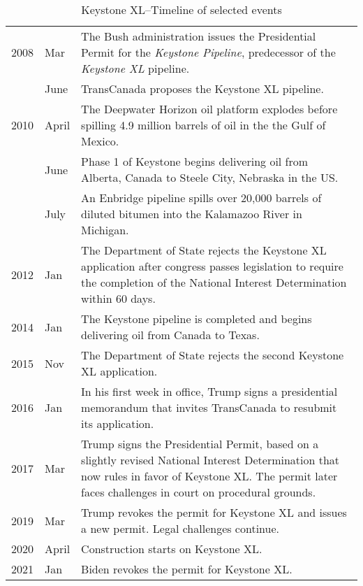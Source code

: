 
\begin{table}
\caption{Keystone XL--Timeline of selected events}
\label{tab:timeline}
\begin{tabularx}{\textwidth}{r @{\hspace{0.5\tabcolsep}} l |@{\timeline} X}
\toprule

2008 & Mar   & The Bush administration issues the Presidential Permit for the \textit{Keystone Pipeline}, predecessor of the \textit{Keystone XL} pipeline.\\
	 & June  & TransCanada proposes the Keystone XL pipeline.\\
2010 & April & The Deepwater Horizon oil platform explodes before spilling 4.9 million barrels of oil in the the Gulf of Mexico.\\
	 & June  & Phase 1 of Keystone begins delivering oil from Alberta, Canada to Steele City, Nebraska in the US.\\
	 & July  & An Enbridge pipeline spills over 20,000 barrels of diluted bitumen into the Kalamazoo River in Michigan.\\
2012 & Jan   & The Department of State rejects the Keystone XL application after congress passes legislation to require the completion of the National Interest Determination within 60 days.\\
2014 & Jan	 & The Keystone pipeline is completed and begins delivering oil from Canada to Texas.\\
2015 & Nov	 & The Department of State rejects the second Keystone XL application.\\
2016 & Jan 	 & In his first week in office, Trump signs a presidential memorandum that invites TransCanada to resubmit its application.\\
2017 & Mar   & Trump signs the Presidential Permit, based on a slightly revised National Interest Determination that now rules in favor of Keystone XL. The permit later faces challenges in court on procedural grounds.\\
2019 & Mar 	 & Trump revokes the permit for Keystone XL and issues a new permit. Legal challenges continue.\\
2020 & April & Construction starts on Keystone XL.\\
2021 & Jan 	 & Biden revokes the permit for Keystone XL.\\
\bottomrule

\end{tabularx}
\end{table}